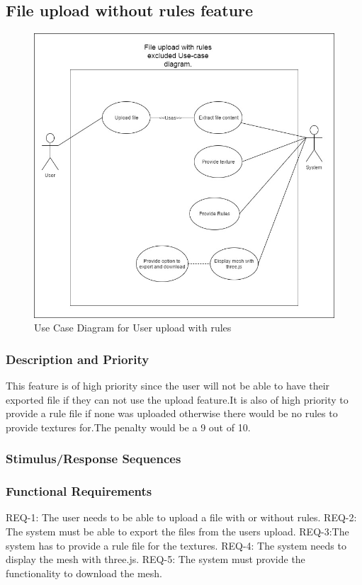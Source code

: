 \documentclass[english]{article}
\begin{document}
			 \subsection{File upload without rules feature}
				\begin{figure}[h]
					\includegraphics[width=\textwidth]{norules.jpg}
					\caption{Use Case Diagram for User upload with rules }
				\end{figure}
			 \subsubsection{Description and Priority}
			 This feature is of high priority since the user will not be able to have their exported file if they can not use the upload feature.It is also of high priority to provide a rule file if none was uploaded otherwise there would be no rules to provide textures for.The penalty would be a 9 out of 10. 
			 \subsubsection{Stimulus/Response Sequences}
			 
			 \subsubsection{Functional Requirements}
			 	REQ-1: The user needs to be able to upload a file with or without rules.
			 	REQ-2: The system must be able to export the files from the users upload.
			 	REQ-3:The system has to provide a rule file for the textures.
			 	REQ-4: The system needs to display the mesh with three.js.
			 	REQ-5: The system must provide the functionality to download the mesh.
	\pagebreak
	
\end{document}
